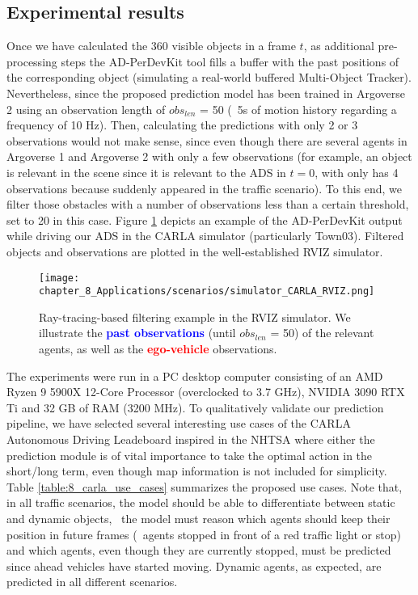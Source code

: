 \subsection{Experimental results}
\label{subsec:8_experimental_results}

Once we have calculated the 360 \degree visible objects in a frame $t$, as additional pre-processing steps the \ac{AD-PerDevKit} tool fills a buffer with the past positions of the corresponding object (simulating a real-world buffered Multi-Object Tracker). Nevertheless, since the proposed prediction model has been trained in Argoverse 2 using an observation length of \textit{$obs_{len}$} = 50 (\ie \ 5s of motion history regarding a frequency of 10 Hz). Then, calculating the predictions with only 2 or 3 observations would not make sense, since even though there are several agents in Argoverse 1 and Argoverse 2 with only a few observations (for example, an object is relevant in the scene since it is relevant to the \ac{ADS} in $t=0$, with only has 4 observations because suddenly appeared in the traffic scenario). To this end, we filter those obstacles with a number of observations less than a certain threshold, set to 20 in this case. Figure \ref{fig:chapter_8_Applications/use_cases/simulator_CARLA_RVIZ} depicts an example of the \ac{AD-PerDevKit} output while driving our \ac{ADS} in the \ac{CARLA} simulator (particularly Town03). Filtered objects and observations are plotted in the well-established RVIZ simulator. 

\begin{figure}[!h]
	\centering
	\texttt{[image: chapter\_8\_Applications/scenarios/simulator\_CARLA\_RVIZ.png]}
	\captionsetup{justification=justified}
	\caption[Ray-tracing-based filtering example in the \ac{RVIZ} simulator]{Ray-tracing-based filtering example in the \ac{RVIZ} simulator. We illustrate the \textbf{\textcolor{blue}{past observations}} (until \textit{$obs_{len}$} = 50) of the relevant agents, as well as the \textbf{\textcolor{red}{ego-vehicle}} observations.}
	\label{fig:chapter_8_Applications/use_cases/simulator_CARLA_RVIZ}
\end{figure}

The experiments were run in a PC desktop computer consisting of an AMD Ryzen 9 5900X 12-Core Processor (overclocked to 3.7 GHz), NVIDIA 3090 RTX Ti and 32 GB of RAM (3200 MHz). To qualitatively validate our prediction pipeline, we have selected several interesting use cases of the \ac{CARLA} Autonomous Driving Leadeboard inspired in the \ac{NHTSA} where either the prediction module is of vital importance to take the optimal action in the short/long term, even though map information is not included for simplicity. Table \ref{table:8_carla_use_cases} summarizes the proposed use cases. Note that, in all traffic scenarios, the model should be able to differentiate between static and dynamic objects, \ie \ the model must reason which agents should keep their position in future frames (\eg \ agents stopped in front of a red traffic light or stop) and which agents, even though they are currently stopped, must be predicted since ahead vehicles have started moving. Dynamic agents, as expected, are predicted in all different scenarios. 

